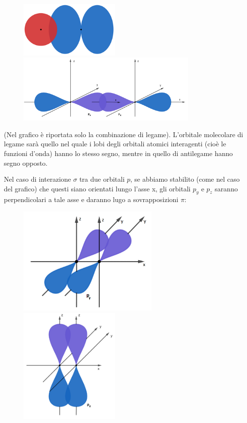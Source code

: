   \begin{figure}[ht]
    {
      \includegraphics[width=5cm]{immagini/legame_sigma_s_p.png}
    }
    \hfill
    {
      \includegraphics[width=9cm]{immagini/legame_sigma_p_p.png}
    }
  \end{figure}

(Nel grafico è riportata solo la combinazione di legame).
L'orbitale molecolare di legame sarà quello nel quale i lobi degli orbitali atomici interagenti (cioè le funzioni d'onda) hanno lo stesso segno, mentre in quello di antilegame hanno segno opposto.

Nel caso di interazione $\sigma$ tra due orbitali $p$, se abbiamo stabilito (come nel caso del grafico) che questi siano orientati lungo l'asse x, gli orbitali $p_y$ e $p_z$ saranno perpendicolari a tale asse e daranno lugo a sovrapposizioni $\pi$:

\begin{figure}[!tbp]
    \centering
    {\includegraphics[width=7cm]{immagini/orbitali_py.png}\label{fig:f3}}
    \hfill
    {\includegraphics[width=5cm]{immagini/orbitali_pz.png}\label{fig:f4}}
\end{figure}

